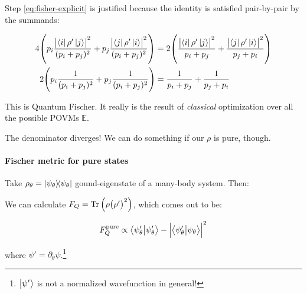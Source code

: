 \documentclass[main.tex]{subfiles}
\begin{document}
Step \eqref{eq:fisher-explicit} is justified because the identity is satisfied pair-by-pair by the summands:

\begin{subequations}
\begin{align}
  4\qty(p_i\frac{\abs{\bra{i} \rho' \ket{j}}^2 }{(p_i + p_j)^2} +
  p_j\frac{\abs{\bra{j} \rho' \ket{i}}^2 }{(p_i + p_j)^2}) &=
  2 \qty(\frac{\abs{\bra{i} \rho' \ket{j}}^2 }{p_i + p_j} +
  \frac{\abs{\bra{j} \rho' \ket{i}}^2 }{p_j + p_i} ) \\
  2\qty(p_i\frac{1 }{(p_i + p_j)^2} +
  p_j\frac{ 1}{(p_i + p_j)^2}) &=
  \frac{1 }{p_i + p_j} +
  \frac{ 1}{p_j + p_i}
\end{align}
\end{subequations}

This is Quantum Fischer. It really is the result of \emph{classical} optimization over all the possible POVMs \(\mathbb{E}\).

The denominator diverges! We can do something if our \(\rho\) is pure, though.

\paragraph{Fischer metric for pure states}

Take \( \rho_\theta = \ketbra{\psi_\theta} \) gound-eigenstate of a many-body system. Then:

\begin{claim}
We can calculate  \( F_Q =  \operatorname*{Tr} \qty(\rho \qty(\rho')^2)\), which comes out to be:

\begin{equation}
F_Q ^{\text{pure}} \propto \braket{\psi_\theta'}{\psi_\theta'} - \abs{\braket{\psi_\theta'}{\psi_\theta}}^2
\end{equation}

where \( \psi' = \partial_\theta \psi \).\footnote{\(\ket{\psi'}\) is not a normalized wavefunction in general!}
\end{claim}
\end{document}
